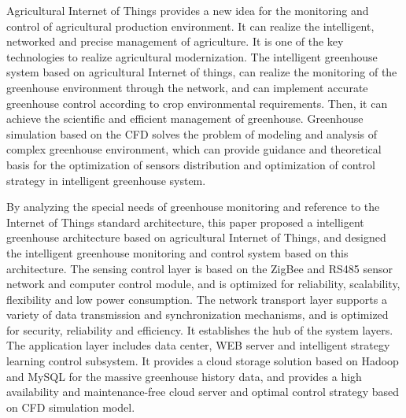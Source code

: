 \begin{englishabstract}

Agricultural Internet of Things provides a new idea for the monitoring and control of agricultural production environment. It can realize the intelligent, networked and precise management of agriculture. It is one of the key technologies to realize agricultural modernization. The intelligent greenhouse system based on agricultural Internet of things, can realize the monitoring  of the greenhouse environment through the network, and can implement accurate greenhouse control according to crop environmental requirements. Then, it can achieve the scientific and efficient management of greenhouse. Greenhouse simulation based on the CFD solves the problem of modeling and analysis of complex greenhouse environment, which can provide guidance and theoretical basis for the optimization of sensors distribution and optimization of control strategy in intelligent greenhouse system.

By analyzing the special needs of greenhouse monitoring and reference to the Internet of Things standard architecture, this paper proposed a intelligent greenhouse architecture based on agricultural Internet of Things, and designed the intelligent greenhouse monitoring and control system based on this architecture. The sensing control layer is based on the ZigBee and RS485 sensor network and computer control module, and is optimized for reliability, scalability, flexibility and low power consumption. The network transport layer supports a variety of data transmission and synchronization mechanisms, and is optimized for security, reliability and efficiency. It establishes the hub of the system layers. The application layer includes data center, WEB server and intelligent strategy learning control subsystem. It provides a cloud storage solution based on Hadoop and MySQL for the massive greenhouse history data, and provides a high availability and maintenance-free cloud server and optimal control strategy based on CFD simulation model. 

\end{englishabstract}

